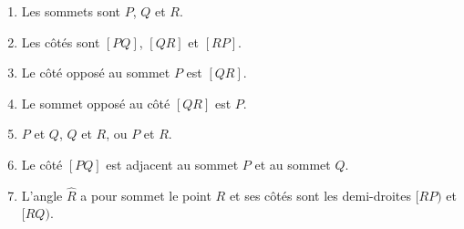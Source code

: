 %
%
    \begin{enumerate}
        \item Les sommets sont $P$, $Q$ et $R$.
        \item Les côtés sont $[PQ]$, $[QR]$ et $[RP]$.
        \item Le côté opposé au sommet $P$ est $[QR]$.
        \item Le sommet opposé au côté $[QR]$ est $P$.
        \item $P$ et $Q$, $Q$ et $R$, ou $P$ et $R$.
        \item Le côté $[PQ]$ est adjacent au sommet $P$ et au sommet $Q$.
        \item L'angle $\widehat{R}$ a pour sommet le point $R$ et ses côtés sont les demi-droites $[RP)$ et $[RQ)$.
    \end{enumerate}

